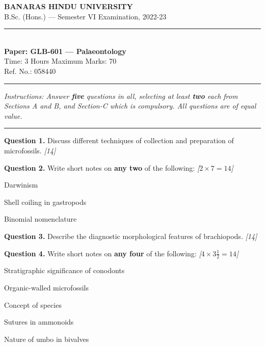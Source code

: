 \documentclass[11pt,a4paper]{article}
\newcommand{\pts}[1]{\hfill   \textit{[#1]}}
\begin{document}
\begin{center}
  {\large\bfseries BANARAS HINDU UNIVERSITY}\\[2pt]
  {\normalsize B.Sc. (Hons.) --- Semester VI Examination, 2022-23}\\[6pt]
  \rule{0.8\linewidth}{0.5pt}\\[6pt]
  {\large\bfseries Paper: GLB-601 --- Palaeontology}\\[4pt]
  {\normalsize Time: 3 Hours \hfill Maximum Marks: 70}\\[2pt]
  {\small Ref. No.: 058440}
\end{center}
\rule{\linewidth}{0.4pt}
\smallskip



\noindent   \textit{Instructions: Answer   \textbf{five} questions in all, selecting at least   \textbf{two} each from Sections A and B, and Section-C which is compulsory. All questions are of equal value.}
\bigskip

\bigskip


\rule{\linewidth}{0.4pt}\smallskip




\noindent   \textbf{Question 1.} Discuss different techniques of collection and preparation of microfossils. \pts{14}

\medskip


\noindent   \textbf{Question 2.} Write short notes on   \textbf{any two} of the following: \pts{$2  \times 7 = 14$}

\begin{parts}
  \item Darwinism
  \item Shell coiling in gastropods
  \item Binomial nomenclature
\end{parts}

\medskip


\noindent   \textbf{Question 3.} Describe the diagnostic morphological features of brachiopods. \pts{14}

\medskip


\noindent   \textbf{Question 4.} Write short notes on   \textbf{any four} of the following: \pts{$4  \times 3\frac{1}{2} = 14$}

\begin{parts}
  \item Stratigraphic significance of conodonts
  \item Organic-walled microfossils
  \item Concept of species
  \item Sutures in ammonoids
  \item Nature of umbo in bivalves
\end{parts}
\end{document}
